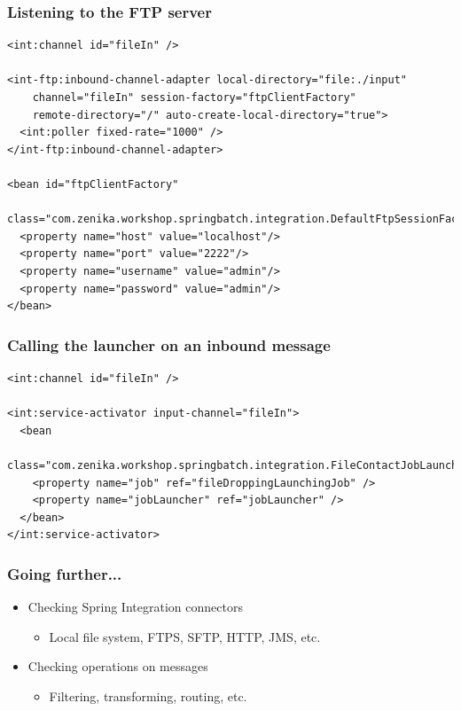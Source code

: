 \begin{frame}[fragile]
 \frametitle{Listening to the FTP server}
 \lstset{language=XML}
 \begin{lstlisting}
<int:channel id="fileIn" />

<int-ftp:inbound-channel-adapter local-directory="file:./input" 
    channel="fileIn" session-factory="ftpClientFactory" 
    remote-directory="/" auto-create-local-directory="true">
  <int:poller fixed-rate="1000" />
</int-ftp:inbound-channel-adapter>

<bean id="ftpClientFactory"
      class="com.zenika.workshop.springbatch.integration.DefaultFtpSessionFactory">
  <property name="host" value="localhost"/>
  <property name="port" value="2222"/>
  <property name="username" value="admin"/>
  <property name="password" value="admin"/>
</bean>
 \end{lstlisting}
\end{frame}

\begin{frame}[fragile]
\frametitle{Calling the launcher on an inbound message}
\lstset{language=XML}
\begin{lstlisting}
<int:channel id="fileIn" />

<int:service-activator input-channel="fileIn">
  <bean 
    class="com.zenika.workshop.springbatch.integration.FileContactJobLauncher">
    <property name="job" ref="fileDroppingLaunchingJob" />
    <property name="jobLauncher" ref="jobLauncher" />
  </bean>
</int:service-activator>
 \end{lstlisting}
\end{frame}

\begin{frame}
 \frametitle{Going further...}
 \begin{itemize}
  \item Checking Spring Integration connectors
  \begin{itemize}
   \item Local file system, FTPS, SFTP, HTTP, JMS, etc.
  \end{itemize}
  \item Checking operations on messages
  \begin{itemize}
   \item Filtering, transforming, routing, etc.
  \end{itemize}
 \end{itemize}
\end{frame}

